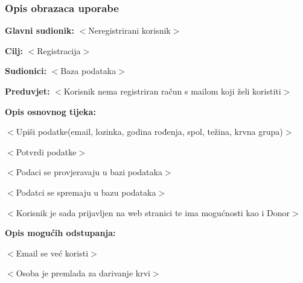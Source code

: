				\subsubsection{Opis obrazaca uporabe}
				
					\noindent {}
					\begin{packed_item}
	
						\item \textbf{Glavni sudionik: }$<$Neregistrirani korisnik$>$
						\item  \textbf{Cilj:} $<$Registracija$>$
						\item  \textbf{Sudionici:} $<$Baza podataka$>$
						\item  \textbf{Preduvjet:} $<$Korisnik nema registriran račun s mailom koji želi koristiti$>$
						\item  \textbf{Opis osnovnog tijeka:}
						
						\item[] \begin{packed_enum}
	
							\item $<$Upiši podatke(email, lozinka, godina rođenja, spol, težina, krvna grupa)$>$
							\item $<$Potvrdi podatke$>$
							\item $<$Podaci se provjeravaju u bazi podataka$>$
							\item $<$Podatci se spremaju u bazu podataka$>$
							\item $<$Korisnik je sada prijavljen na web stranici te ima mogućnosti kao i Donor$>$
						\end{packed_enum}
						
						\item  \textbf{Opis mogućih odstupanja:}
						
						\item[] \begin{packed_item}
	
							\item[3.a] $<$Email se već koristi$>$
							\item[3.b] $<$Osoba je premlada za darivanje krvi$>$
						\end{packed_item}
					\end{packed_item}
					
